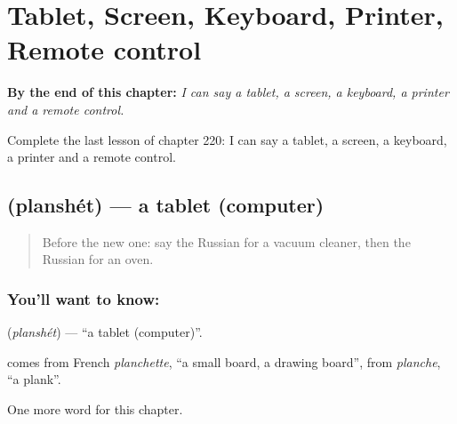 
\chapter{Tablet, Screen, Keyboard, Printer, Remote control}
\label{ch:ru-tablet-screen-keyboard-printer-remote-control}

\begin{chapteropening}
\textbf{By the end of this chapter:} \emph{I can say a tablet, a screen, a keyboard, a printer and a remote control.}

Complete the last lesson of chapter 220: I can say a tablet, a screen, a keyboard, a printer and a remote control.
\end{chapteropening}

\section[\texorpdfstring{\ru{планшет} (planshét)}{планшет (planshét)}]{ (planshét) — a tablet (computer)}

\label{lesson:RU-C220-planshet}



\begin{quote}
Before the new one: say the Russian for a vacuum cleaner, then the Russian for an oven.
\end{quote}

\subsection*{You'll want to know: }
\textbf{} (\emph{planshét}) — \textquotedblleft{}a tablet (computer)\textquotedblright{}.

\begin{cousinweb}
\textbf{} comes from French \emph{planchette}, \textquotedblleft{}a small board, a drawing board\textquotedblright{}, from \emph{planche}, \textquotedblleft{}a plank\textquotedblright{}.
\end{cousinweb}

\begin{grammarlens}[title={What you've built}]
One more word for this chapter.
\end{grammarlens}

